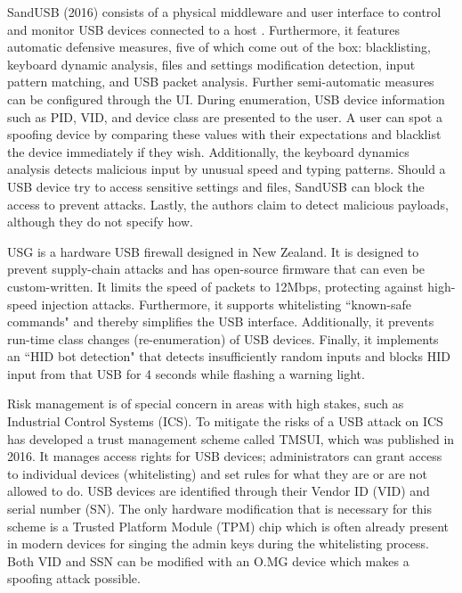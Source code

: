 SandUSB (2016) consists of a physical middleware and user interface to control and monitor USB devices connected to a host \cite{loeSandUSBInstallationfreeSandbox2016}. Furthermore, it features automatic defensive measures, five of which come out of the box: blacklisting, keyboard dynamic analysis, files and settings modification detection, input pattern matching, and USB packet analysis. Further semi-automatic measures can be configured through the UI. 
During enumeration, USB device information such as PID, VID, and device class are presented to the user. A user can spot a spoofing device by comparing these values with their expectations and blacklist the device immediately if they wish.
Additionally, the keyboard dynamics analysis detects malicious input by unusual speed and typing patterns. Should a USB device try to access sensitive settings and files, SandUSB can block the access to prevent attacks. Lastly, the authors claim to detect malicious payloads, although they do not specify how. 

USG \cite{robertfiskRobertfiskUSG2016} is a hardware USB firewall designed in New Zealand. It is designed to prevent supply-chain attacks and has open-source firmware that can even be custom-written. It limits the speed of packets to 12Mbps, protecting against high-speed injection attacks. Furthermore, it supports whitelisting ``known-safe commands" and thereby simplifies the USB interface. Additionally, it prevents run-time class changes (re-enumeration) of USB devices. Finally, it implements an ``HID bot detection" that detects insufficiently random inputs and blocks HID input from that USB for 4 seconds while flashing a warning light. 

Risk management is of special concern in areas with high stakes, such as Industrial Control Systems (ICS). To mitigate the risks of a USB attack on ICS \cite{yangTMSUITrustManagement2016} has developed a trust management scheme called TMSUI, which was published in 2016. It manages access rights for USB devices; administrators can grant access to individual devices (whitelisting) and set rules for what they are or are not allowed to do. USB devices are identified through their Vendor ID (VID) and serial number (SN). The only hardware modification that is necessary for this scheme is a Trusted Platform Module (TPM) chip which is often already present in modern devices for singing the admin keys during the whitelisting process. \\
Both VID and SSN can be modified with an O.MG device which makes a spoofing attack possible.

